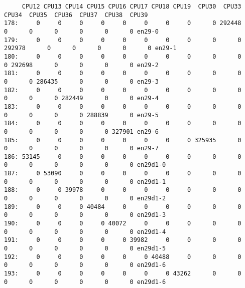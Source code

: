 \begin{landscape}
\vspace*{\fill}
\begin{lstlisting}
     CPU12 CPU13 CPU14 CPU15 CPU16 CPU17 CPU18 CPU19  CPU30  CPU33  CPU34  CPU35  CPU36  CPU37  CPU38  CPU39
178:     0     0     0     0     0     0     0     0      0 292448      0      0      0      0      0      0 en29-0
179:     0     0     0     0     0     0     0     0      0      0 292978      0      0      0      0      0 en29-1
180:     0     0     0     0     0     0     0     0      0      0      0 292698      0      0      0      0 en29-2
181:     0     0     0     0     0     0     0     0      0      0      0      0 286435      0      0      0 en29-3
182:     0     0     0     0     0     0     0     0      0      0      0      0      0 282449      0      0 en29-4
183:     0     0     0     0     0     0     0     0      0      0      0      0      0      0 288839      0 en29-5
184:     0     0     0     0     0     0     0     0      0      0      0      0      0      0      0 327901 en29-6
185:     0     0     0     0     0     0     0     0 325935      0      0      0      0      0      0      0 en29-7
186: 53145     0     0     0     0     0     0     0      0      0      0      0      0      0      0      0 en29d1-0
187:     0 53090     0     0     0     0     0     0      0      0      0      0      0      0      0      0 en29d1-1
188:     0     0 39978     0     0     0     0     0      0      0      0      0      0      0      0      0 en29d1-2
189:     0     0     0 40484     0     0     0     0      0      0      0      0      0      0      0      0 en29d1-3
190:     0     0     0     0 40072     0     0     0      0      0      0      0      0      0      0      0 en29d1-4
191:     0     0     0     0     0 39982     0     0      0      0      0      0      0      0      0      0 en29d1-5
192:     0     0     0     0     0     0 40488     0      0      0      0      0      0      0      0      0 en29d1-6
193:     0     0     0     0     0     0     0 43262      0      0      0      0      0      0      0      0 en29d1-6
\end{lstlisting}
\vspace*{\fill}
\end{landscape}


